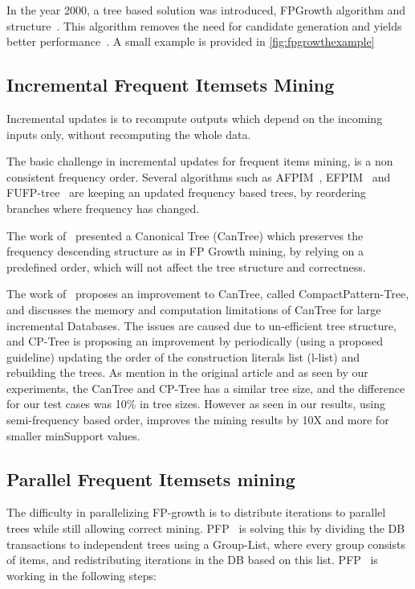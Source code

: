 In the year 2000, a tree based solution was introduced, FPGrowth algorithm and structure~\cite{agrawal1994fast}. This algorithm removes the need for candidate generation and yields better performance~\cite{hunyadi2011performance}. A small example is provided in \autoref{fig:fpgrowthexample}


\subsection{Incremental Frequent Itemsets Mining}
Incremental updates is to recompute outputs which depend on the incoming inputs only, without recomputing the whole data.

The basic challenge in incremental updates for frequent items mining, is a non consistent frequency order. Several algorithms such as AFPIM~\cite{koh2004efficient}, EFPIM~\cite{li2006fast} and FUFP-tree~\cite{hong2008incrementally} are keeping an updated frequency based trees, by reordering branches where frequency has changed.

The work of~\cite{leung2005cantree} presented a Canonical Tree (CanTree) which preserves the frequency descending structure as in FP Growth mining, by relying on a predefined order, which will not affect the tree structure and correctness.

	The work of~\cite{tanbeer2009efficient} proposes an improvement to CanTree, called CompactPattern-Tree, and discusses the memory and computation limitations of CanTree for large incremental Databases. The issues are caused due to un-efficient tree structure, and CP-Tree is proposing an improvement by periodically (using a proposed guideline) updating the order of the construction literals list (l-list) and rebuilding the trees. As mention in the original article and as seen by our experiments, the CanTree and CP-Tree has a similar tree size, and the difference for our test cases was 10\% in tree sizes. However as seen in our results, using semi-frequency based order, improves the mining results by 10X and more for smaller minSupport values.
	
	

\subsection{Parallel Frequent Itemsets mining}
The difficulty in parallelizing FP-growth is to distribute iterations to parallel trees while still allowing correct mining. PFP~\cite{li2008pfp} is solving this by dividing the DB transactions to independent trees using a Group-List, where every group consists of items, and redistributing iterations in the DB based on this list.
PFP~\cite{li2008pfp} is working in the following steps:

